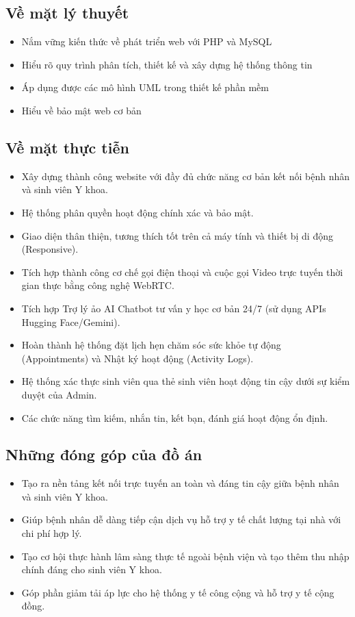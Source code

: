 \documentclass[a4paper,13pt]{extreport}
\begin{document}
\subsection{Về mặt lý thuyết}
\begin{itemize}
    \item Nắm vững kiến thức về phát triển web với PHP và MySQL
    \item Hiểu rõ quy trình phân tích, thiết kế và xây dựng hệ thống thông tin
    \item Áp dụng được các mô hình UML trong thiết kế phần mềm
    \item Hiểu về bảo mật web cơ bản
\end{itemize}

\subsection{Về mặt thực tiễn}
\begin{itemize}
    \item Xây dựng thành công website với đầy đủ chức năng cơ bản kết nối bệnh nhân và sinh viên Y khoa.
    \item Hệ thống phân quyền hoạt động chính xác và bảo mật.
    \item Giao diện thân thiện, tương thích tốt trên cả máy tính và thiết bị di động (Responsive).
    \item Tích hợp thành công cơ chế gọi điện thoại và cuộc gọi Video trực tuyến thời gian thực bằng công nghệ WebRTC.
    \item Tích hợp Trợ lý ảo AI Chatbot tư vấn y học cơ bản 24/7 (sử dụng APIs Hugging Face/Gemini).
    \item Hoàn thành hệ thống đặt lịch hẹn chăm sóc sức khỏe tự động (Appointments) và Nhật ký hoạt động (Activity Logs).
    \item Hệ thống xác thực sinh viên qua thẻ sinh viên hoạt động tin cậy dưới sự kiểm duyệt của Admin.
    \item Các chức năng tìm kiếm, nhắn tin, kết bạn, đánh giá hoạt động ổn định.
\end{itemize}

\subsection{Những đóng góp của đồ án}
\begin{itemize}
    \item Tạo ra nền tảng kết nối trực tuyến an toàn và đáng tin cậy giữa bệnh nhân và sinh viên Y khoa.
    \item Giúp bệnh nhân dễ dàng tiếp cận dịch vụ hỗ trợ y tế chất lượng tại nhà với chi phí hợp lý.
    \item Tạo cơ hội thực hành lâm sàng thực tế ngoài bệnh viện và tạo thêm thu nhập chính đáng cho sinh viên Y khoa.
    \item Góp phần giảm tải áp lực cho hệ thống y tế công cộng và hỗ trợ y tế cộng đồng.
\end{itemize}
\end{document}
